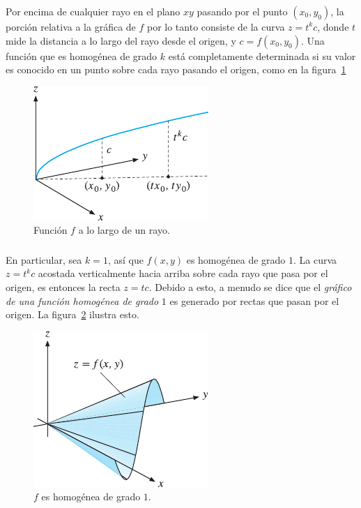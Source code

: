 \begin{frame}
\frametitle{\subsecname}
	\begin{minipage}{0.45\textwidth}
	Por encima de cualquier rayo en el plano $xy$ pasando por el punto $\left(x_{0},y_{0}\right)$, la porción relativa a la gráfica de $f$ por lo tanto consiste de la curva $z=t^{k}c$, donde $t$ mide la distancia a lo largo del rayo desde el origen, y $c=f\left(x_{0},y_{0}\right)$. Una función que es homogénea de grado $k$ está completamente determinada si su valor es conocido en un punto sobre cada rayo pasando el origen, como en la figura~\ref{fig:along}
	\end{minipage}
	\begin{minipage}{0.45\textwidth}
		\begin{figure}
			\centering
			\includegraphics[width=0.4\paperwidth]{along_a_ray}
			\caption{Función $f$ a lo largo de un rayo.}\label{fig:along}
		\end{figure}
	\end{minipage}
\end{frame}

\begin{frame}
	\frametitle{\subsecname}
	\begin{minipage}{0.45\textwidth}
		En particular, sea $k=1$, así que $f\left(x,y\right)$ es homogénea de grado $1$. La curva $z=t^{k}c$ acostada verticalmente hacia arriba sobre cada rayo que pasa por el origen, es entonces la recta $z=tc$. Debido a esto, a menudo se dice que el \emph{gráfico de una función homogénea de grado} $1$ es generado por rectas que pasan por el origen. La figura~\ref{fig:homogenous} ilustra esto.
	\end{minipage}
	\begin{minipage}{0.45\textwidth}
		\begin{figure}
			\centering
			\includegraphics[width=0.4\paperwidth]{homogenous}
			\caption{$f$ es homogénea de grado $1$.}\label{fig:homogenous}
		\end{figure}
	\end{minipage}
\end{frame}



